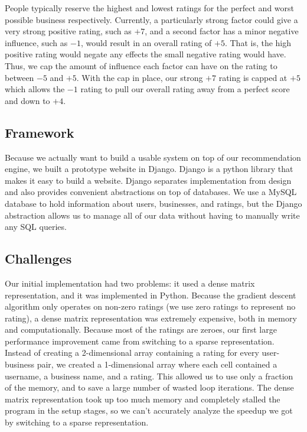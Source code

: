 People typically reserve the highest and lowest ratings for the perfect and
worst possible business respectively. Currently, a particularly strong factor
could give a very strong positive rating, such as $+7$, and a second factor has
a minor negative influence, such as $-1$, would result in an overall rating of
$+5$. That is, the high positive rating would negate any effects the small
negative rating would have. Thus, we cap the amount of influence each factor
can have on the rating to between $-5$ and $+5$. With the cap in place, our
strong $+7$ rating is capped at $+5$ which allows the $-1$ rating to pull our
overall rating away from a perfect score and down to $+4$. \cite{funk}

\subsection{Framework}

Because we actually want to build a usable system on top of our recommendation
engine, we built a prototype website in Django\cite{django}. Django is a python
library that makes it easy to build a website. Django separates implementation
from design and also provides convenient abstractions on top of databases. We
use a MySQL database to hold information about users, businesses, and ratings,
but the Django abstraction allows us to manage all of our data without having
to manually write any SQL queries.

\subsection{Challenges}

Our initial implementation had two problems: it used a dense matrix
representation, and it was implemented in Python. Because the gradient descent
algorithm only operates on non-zero ratings (we use zero ratings to represent
no rating), a dense matrix representation was extremely expensive, both in
memory and computationally. Because most of the ratings are zeroes, our first
large performance improvement came from switching to a sparse representation.
Instead of creating a 2-dimensional array containing a rating for every
user-business pair, we created a 1-dimensional array where each cell contained a
username, a business name, and a rating. This allowed us to use only a fraction
of the memory, and to save a large number of wasted loop iterations. The dense
matrix representation took up too much memory and completely stalled the program
in the setup stages, so we can't accurately analyze the speedup we got by
switching to a sparse representation.

